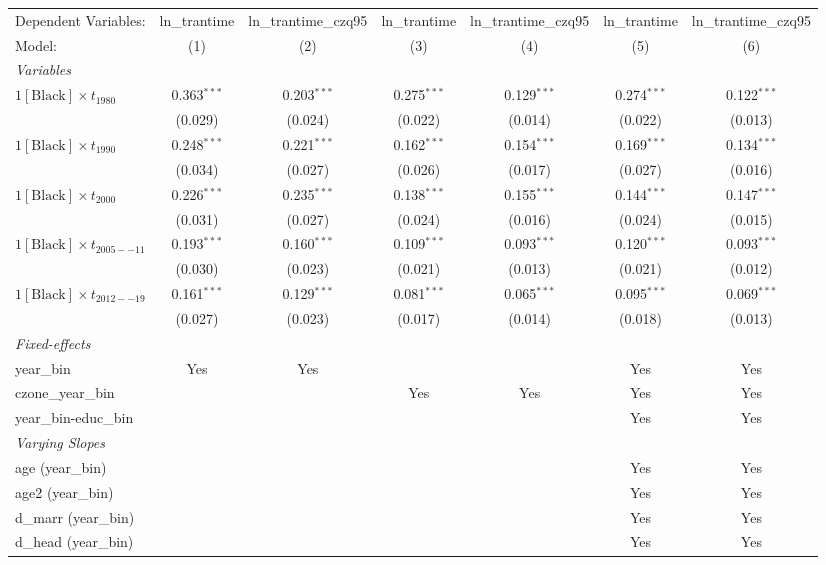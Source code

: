\begin{tabular}{lcccccc}
\tabularnewline\midrule\midrule
Dependent Variables:&ln\_trantime&ln\_trantime\_czq95&ln\_trantime&ln\_trantime\_czq95&ln\_trantime&ln\_trantime\_czq95\\
Model:&(1) & (2) & (3) & (4) & (5) & (6)\\
\midrule \emph{Variables}&   &   &   &   &   &  \\
$1[\text{Black}] \times t_{1980}$ & 0.363$^{***}$ & 0.203$^{***}$ & 0.275$^{***}$ & 0.129$^{***}$ & 0.274$^{***}$ & 0.122$^{***}$\\
  &(0.029) & (0.024) & (0.022) & (0.014) & (0.022) & (0.013)\\
$1[\text{Black}] \times t_{1990}$ & 0.248$^{***}$ & 0.221$^{***}$ & 0.162$^{***}$ & 0.154$^{***}$ & 0.169$^{***}$ & 0.134$^{***}$\\
  &(0.034) & (0.027) & (0.026) & (0.017) & (0.027) & (0.016)\\
$1[\text{Black}] \times t_{2000}$ & 0.226$^{***}$ & 0.235$^{***}$ & 0.138$^{***}$ & 0.155$^{***}$ & 0.144$^{***}$ & 0.147$^{***}$\\
  &(0.031) & (0.027) & (0.024) & (0.016) & (0.024) & (0.015)\\
$1[\text{Black}] \times t_{2005--11}$ & 0.193$^{***}$ & 0.160$^{***}$ & 0.109$^{***}$ & 0.093$^{***}$ & 0.120$^{***}$ & 0.093$^{***}$\\
  &(0.030) & (0.023) & (0.021) & (0.013) & (0.021) & (0.012)\\
$1[\text{Black}] \times t_{2012--19}$ & 0.161$^{***}$ & 0.129$^{***}$ & 0.081$^{***}$ & 0.065$^{***}$ & 0.095$^{***}$ & 0.069$^{***}$\\
  &(0.027) & (0.023) & (0.017) & (0.014) & (0.018) & (0.013)\\
\midrule \emph{Fixed-effects}&   &   &   &   &   &  \\
year\_bin & Yes & Yes &  &  & Yes & Yes\\
czone\_year\_bin &  &  & Yes & Yes & Yes & Yes\\
year\_bin-educ\_bin &  &  &  &  & Yes & Yes\\
\midrule \emph{Varying Slopes}&   &   &   &   &   &  \\
age (year\_bin) &  &  &  &  & Yes & Yes\\
age2 (year\_bin) &  &  &  &  & Yes & Yes\\
d\_marr (year\_bin) &  &  &  &  & Yes & Yes\\
d\_head (year\_bin) &  &  &  &  & Yes & Yes\\

\end{tabular}

